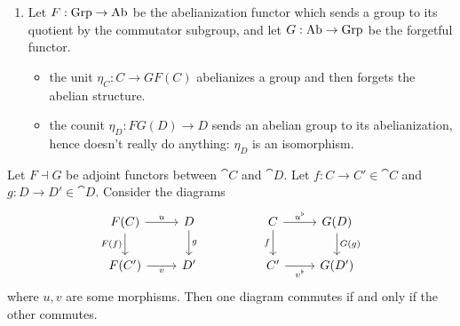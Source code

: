 \documentclass[12pt]{article}
\begin{document}
\begin{example}
\begin{enumerate}
		\item Let $F:\text{Grp}\to\text{Ab}$ be the abelianization functor which sends a group to its quotient by the commutator subgroup, and let $G:\text{Ab}\to\text{Grp}$ be the forgetful functor. 
			\begin{itemize}
				\item the unit $\eta_C: C\to GF(C)$ abelianizes a group and then forgets the abelian structure. 
				\item the counit $\eta_D: FG(D) \to D$ sends an abelian group to its abelianization, hence doesn't really do anything: $\eta_D$ is an isomorphism.
			\end{itemize}
	\end{enumerate}
\end{example}

\begin{proposition}
	Let $F\dashv G$ be adjoint functors between $\cat{C}$ and $\cat{D}$. Let $f:C\to C'\in \cat{C}$ and $g: D\to D'\in\cat{D}$. Consider the diagrams 
	\begin{equation*}
\begin{tikzcd}
F(C) \arrow[d, "F(f)"'] \arrow[r, "u"] & D \arrow[d, "g"] &  & C \arrow[d, "f"'] \arrow[r, "u^\flat"] & G(D) \arrow[d, "G(g)"] \\
F(C') \arrow[r, "v"']                  & D'               &  & C' \arrow[r, "v^\flat"']               & G(D')                 
\end{tikzcd}
	\end{equation*}
	where $u, v$ are some morphisms. Then one diagram commutes if and only if the other commutes.
\end{proposition}
\end{document}
